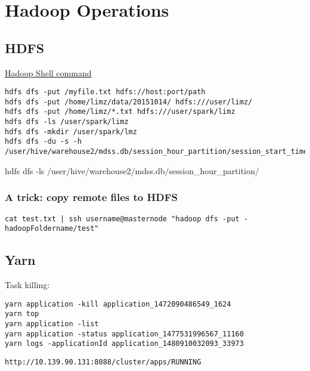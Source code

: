 \section{Hadoop Operations}

\subsection{HDFS}

\href{https://hadoop.apache.org/docs/r1.0.4/cn/hdfs_shell.html}{Hadoop Shell
command}

\begin{verbatim}
hdfs dfs -put /myfile.txt hdfs://host:port/path
hdfs dfs -put /home/limz/data/20151014/ hdfs:///user/limz/
hdfs dfs -put /home/limz/*.txt hdfs:///user/spark/limz
hdfs dfs -ls /user/spark/limz
hdfs dfs -mkdir /user/spark/lmz
hdfs dfs -du -s -h  /user/hive/warehouse2/mdss.db/session_hour_partition/session_start_time=20170420
\end{verbatim}hdfs dfs -ls  /user/hive/warehouse2/mdss.db/session_hour_partition/

\subsubsection{A trick: copy remote files to HDFS}

\begin{verbatim}
cat test.txt | ssh username@masternode "hadoop dfs -put - hadoopFoldername/test"
\end{verbatim}




\subsection{Yarn}

Task killing:
\begin{verbatim}
yarn application -kill application_1472090486549_1624
yarn top
yarn application -list
yarn application -status application_1477531996567_11160
yarn logs -applicationId application_1480910032093_33973
\end{verbatim}


\begin{verbatim}
http://10.139.90.131:8088/cluster/apps/RUNNING
\end{verbatim}






